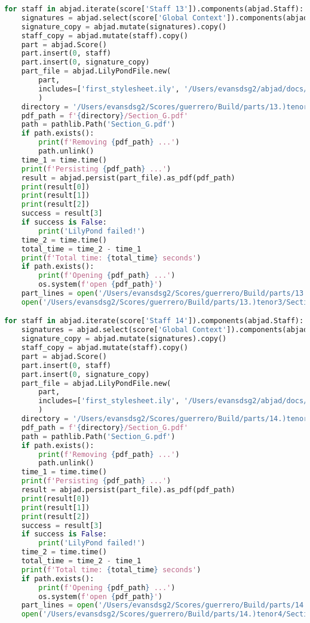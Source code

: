 \begin{lstlisting}[language=Python, caption=Invocation Source Code]
for staff in abjad.iterate(score['Staff 13']).components(abjad.Staff):
    signatures = abjad.select(score['Global Context']).components(abjad.Staff)
    signature_copy = abjad.mutate(signatures).copy()
    staff_copy = abjad.mutate(staff).copy()
    part = abjad.Score()
    part.insert(0, staff)
    part.insert(0, signature_copy)
    part_file = abjad.LilyPondFile.new(
        part,
        includes=['first_stylesheet.ily', '/Users/evansdsg2/abjad/docs/source/_stylesheets/abjad.ily'],
        )
    directory = '/Users/evansdsg2/Scores/guerrero/Build/parts/13.)tenor3'
    pdf_path = f'{directory}/Section_G.pdf'
    path = pathlib.Path('Section_G.pdf')
    if path.exists():
        print(f'Removing {pdf_path} ...')
        path.unlink()
    time_1 = time.time()
    print(f'Persisting {pdf_path} ...')
    result = abjad.persist(part_file).as_pdf(pdf_path)
    print(result[0])
    print(result[1])
    print(result[2])
    success = result[3]
    if success is False:
        print('LilyPond failed!')
    time_2 = time.time()
    total_time = time_2 - time_1
    print(f'Total time: {total_time} seconds')
    if path.exists():
        print(f'Opening {pdf_path} ...')
        os.system(f'open {pdf_path}')
    part_lines = open('/Users/evansdsg2/Scores/guerrero/Build/parts/13.)tenor3/Section_G.ly').readlines()
    open('/Users/evansdsg2/Scores/guerrero/Build/parts/13.)tenor3/Section_G.ly', 'w').writelines(part_lines[15:-1])

for staff in abjad.iterate(score['Staff 14']).components(abjad.Staff):
    signatures = abjad.select(score['Global Context']).components(abjad.Staff)
    signature_copy = abjad.mutate(signatures).copy()
    staff_copy = abjad.mutate(staff).copy()
    part = abjad.Score()
    part.insert(0, staff)
    part.insert(0, signature_copy)
    part_file = abjad.LilyPondFile.new(
        part,
        includes=['first_stylesheet.ily', '/Users/evansdsg2/abjad/docs/source/_stylesheets/abjad.ily'],
        )
    directory = '/Users/evansdsg2/Scores/guerrero/Build/parts/14.)tenor4'
    pdf_path = f'{directory}/Section_G.pdf'
    path = pathlib.Path('Section_G.pdf')
    if path.exists():
        print(f'Removing {pdf_path} ...')
        path.unlink()
    time_1 = time.time()
    print(f'Persisting {pdf_path} ...')
    result = abjad.persist(part_file).as_pdf(pdf_path)
    print(result[0])
    print(result[1])
    print(result[2])
    success = result[3]
    if success is False:
        print('LilyPond failed!')
    time_2 = time.time()
    total_time = time_2 - time_1
    print(f'Total time: {total_time} seconds')
    if path.exists():
        print(f'Opening {pdf_path} ...')
        os.system(f'open {pdf_path}')
    part_lines = open('/Users/evansdsg2/Scores/guerrero/Build/parts/14.)tenor4/Section_G.ly').readlines()
    open('/Users/evansdsg2/Scores/guerrero/Build/parts/14.)tenor4/Section_G.ly', 'w').writelines(part_lines[15:-1])


\end{lstlisting}
